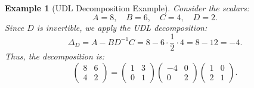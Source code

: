 \documentclass[a4 paper]{article}
\numberwithin{equation}{section}
\theoremstyle{boldStyle}
\theoremstyle{boldBlueStyle}
\newtheorem{lemma}{Lemma}[section]
\theoremstyle{boldPurpleStyle}
\theoremstyle{boldRedStyle}
\theoremstyle{boldGreenStyle}
\newtheorem{example}{Example}[section]
\begin{document}
\begin{example}[UDL Decomposition Example]
  Consider the scalars:
  \[
  A = 8, \quad B = 6, \quad C = 4, \quad D = 2.
  \]
  Since \( D \) is invertible, we apply the UDL decomposition:
  \[
  \Delta_D = A - BD^{-1}C = 8 - 6 \cdot \frac{1}{2} \cdot 4 = 8 - 12 = -4.
  \]
  Thus, the decomposition is:
  \[
  \begin{pmatrix}
  8 & 6 \\
  4 & 2
  \end{pmatrix} =
  \begin{pmatrix}
  1 & 3 \\
  0 & 1
  \end{pmatrix}
  \begin{pmatrix}
  -4 & 0 \\
  0 & 2
  \end{pmatrix}
  \begin{pmatrix}
  1 & 0 \\
  2 & 1
  \end{pmatrix}.
  \]
\end{example}




\bigbreak



\end{document}
